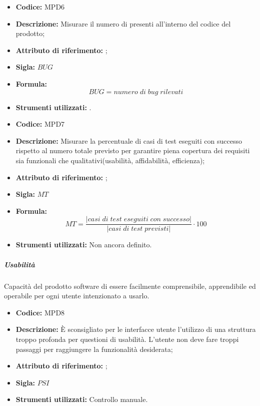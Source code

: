 \begin{itemize}
    \item \textbf{Codice:} MPD6
    \item \textbf{Descrizione:} Misurare il numero di  presenti all'interno del codice del prodotto;
    \item \textbf{Attributo di riferimento:} ;
    \item \textbf{Sigla:} $BUG$
    \item \textbf{Formula:} $$BUG = {numero \; di \; bug \; rilevati}$$
    \item \textbf{Strumenti utilizzati:} .
\end{itemize}

\begin{itemize}
    \item \textbf{Codice:} MPD7
    \item \textbf{Descrizione:} Misurare la percentuale di casi di test eseguiti con successo rispetto al numero totale previsto per garantire piena copertura dei requisiti sia funzionali che qualitativi(usabilità, affidabilità, efficienza);
    \item \textbf{Attributo di riferimento:} ;
    \item \textbf{Sigla:} $MT$
    \item \textbf{Formula:} $$MT = \frac{|casi \; di \; test \; eseguiti \; con \; successo|}{|casi \; di \; test \; previsti|} \cdot 100$$
    \item \textbf{Strumenti utilizzati:} Non ancora definito.
\end{itemize}
       
\subparagraph{Usabilità}
Capacità del prodotto software di essere facilmente comprensibile, apprendibile ed operabile per ogni utente intenzionato a usarlo.

\begin{itemize}
    \item \textbf{Codice:} MPD8
    \item \textbf{Descrizione:} È sconsigliato per le interfacce utente l'utilizzo di una struttura troppo profonda per questioni di usabilità. L'utente non deve fare troppi passaggi per raggiungere la funzionalità desiderata;
    \item \textbf{Attributo di riferimento:} ;
    \item \textbf{Sigla:} $PSI$
    \item \textbf{Strumenti utilizzati:} Controllo manuale.
\end{itemize}